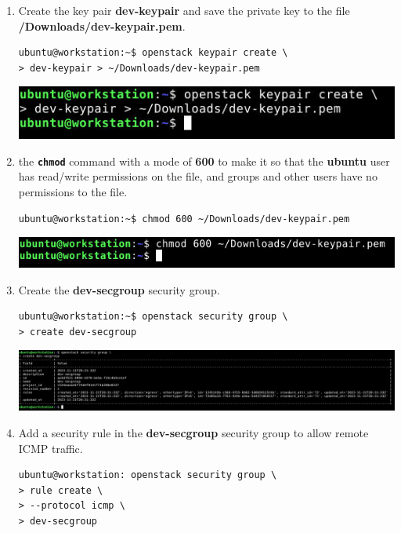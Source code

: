 \documentclass[letterpaper, 12pt]{article}
\begin{document}
\begin{enumerate}
    \item Create the key pair \textbf{dev-keypair} and save the private key to the file
    \textbf{\texttildemid/Downloads/dev-keypair.pem}.
\begin{lstlisting}
ubuntu@workstation:~$ openstack keypair create \
> dev-keypair > ~/Downloads/dev-keypair.pem
\end{lstlisting}

    \begin{center}
        \includegraphics[width=\linewidth]{images/part4/step15.png}
    \end{center}

    \item the \textbf{\texttt{chmod}} command with a mode of \textbf{600} to make it so that the \textbf{ubuntu} user
    has read/write permissions on the file, and groups and other users have no permissions to the file.
\begin{lstlisting}
ubuntu@workstation:~$ chmod 600 ~/Downloads/dev-keypair.pem
\end{lstlisting}

    \begin{center}
        \includegraphics[width=\linewidth]{images/part4/step16.png}
    \end{center}

    \item Create the \textbf{dev-secgroup} security group.
\begin{lstlisting}
ubuntu@workstation:~$ openstack security group \
> create dev-secgroup
\end{lstlisting}

    \begin{center}
        \includegraphics[width=\linewidth]{images/part4/step17.png}
    \end{center}

    \item Add a security rule in the \textbf{dev-secgroup} security group to allow remote ICMP traffic.
\begin{lstlisting}
ubuntu@workstation: openstack security group \
> rule create \
> --protocol icmp \
> dev-secgroup
\end{lstlisting}


\end{enumerate}
\end{document}
